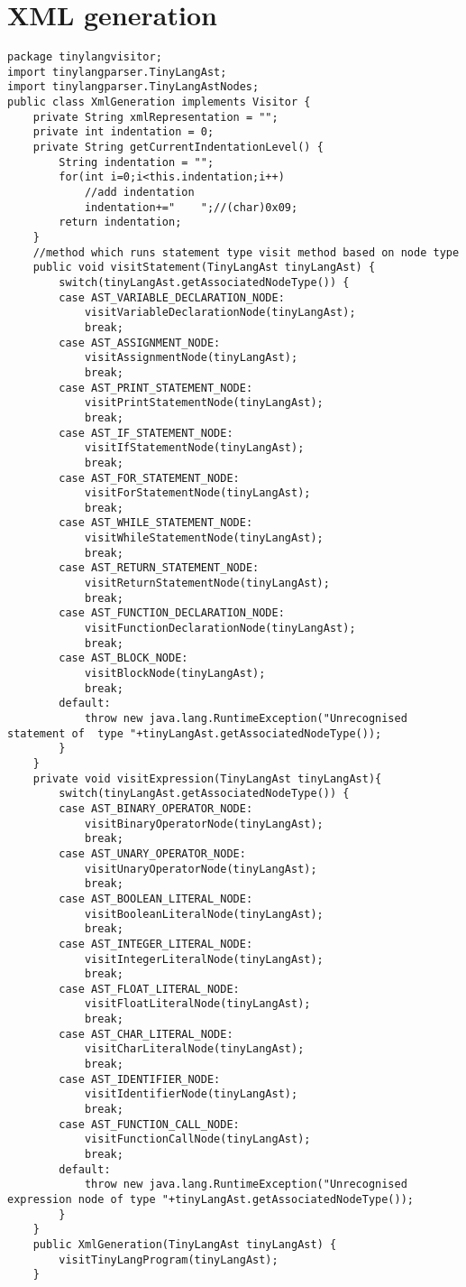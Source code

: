 \section{XML generation}
\begin{lstlisting}[basicstyle=\miniscule,caption=Generating an XML representation of AST,label=listing:xmlGeneration]
package tinylangvisitor;
import tinylangparser.TinyLangAst;
import tinylangparser.TinyLangAstNodes;
public class XmlGeneration implements Visitor {
	private String xmlRepresentation = "";
	private int indentation = 0;
	private String getCurrentIndentationLevel() {
		String indentation = "";
		for(int i=0;i<this.indentation;i++)
			//add indentation
			indentation+="    ";//(char)0x09;
		return indentation;
	}
	//method which runs statement type visit method based on node type
	public void visitStatement(TinyLangAst tinyLangAst) {
		switch(tinyLangAst.getAssociatedNodeType()) {
		case AST_VARIABLE_DECLARATION_NODE:
			visitVariableDeclarationNode(tinyLangAst);
			break;
		case AST_ASSIGNMENT_NODE:
			visitAssignmentNode(tinyLangAst);
			break;
		case AST_PRINT_STATEMENT_NODE:
			visitPrintStatementNode(tinyLangAst);
			break;
		case AST_IF_STATEMENT_NODE:
			visitIfStatementNode(tinyLangAst);
			break;
		case AST_FOR_STATEMENT_NODE:
			visitForStatementNode(tinyLangAst);
			break;
		case AST_WHILE_STATEMENT_NODE:
			visitWhileStatementNode(tinyLangAst);
			break;
		case AST_RETURN_STATEMENT_NODE:
			visitReturnStatementNode(tinyLangAst);
			break;
		case AST_FUNCTION_DECLARATION_NODE:
			visitFunctionDeclarationNode(tinyLangAst);
			break;
		case AST_BLOCK_NODE:
			visitBlockNode(tinyLangAst);
			break;
		default:
			throw new java.lang.RuntimeException("Unrecognised statement of  type "+tinyLangAst.getAssociatedNodeType());
		}	
	}
	private void visitExpression(TinyLangAst tinyLangAst){
		switch(tinyLangAst.getAssociatedNodeType()) {
		case AST_BINARY_OPERATOR_NODE:
			visitBinaryOperatorNode(tinyLangAst);
			break;
		case AST_UNARY_OPERATOR_NODE:
			visitUnaryOperatorNode(tinyLangAst);
			break;
		case AST_BOOLEAN_LITERAL_NODE:
			visitBooleanLiteralNode(tinyLangAst);
			break;
		case AST_INTEGER_LITERAL_NODE:
			visitIntegerLiteralNode(tinyLangAst);
			break;
		case AST_FLOAT_LITERAL_NODE:
			visitFloatLiteralNode(tinyLangAst);
			break;
		case AST_CHAR_LITERAL_NODE:
			visitCharLiteralNode(tinyLangAst);
			break;
		case AST_IDENTIFIER_NODE:
			visitIdentifierNode(tinyLangAst);
			break;
		case AST_FUNCTION_CALL_NODE:
			visitFunctionCallNode(tinyLangAst);
			break;
		default:
			throw new java.lang.RuntimeException("Unrecognised expression node of type "+tinyLangAst.getAssociatedNodeType());
		}	
	}
	public XmlGeneration(TinyLangAst tinyLangAst) {
		visitTinyLangProgram(tinyLangAst);
	}


\end{lstlisting}
